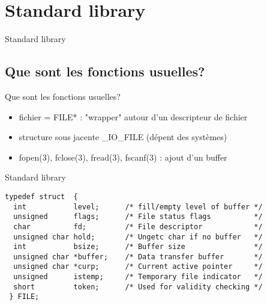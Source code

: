\def\sectitle{Standard library}
\section{\sectitle}

\begin{frame}{\sectitle}
\def\subsectitle{Que sont les fonctions usuelles?}
\subsection{\subsectitle}
\begin{block}{\subsectitle}
\begin{itemize}
    \item fichier = FILE* : "wrapper" autour d'un descripteur de fichier
    \item structure sous jacente \_IO\_FILE (dépent des systèmes)
    \item fopen(3), fclose(3), fread(3), fscanf(3) : ajout d'un buffer
\end{itemize}
\end{block}
\end{frame}




\begin{frame}[containsverbatim]{\sectitle}
\begin{verbatim}
typedef struct  {
  int           level;      /* fill/empty level of buffer */
  unsigned      flags;      /* File status flags          */
  char          fd;         /* File descriptor            */
  unsigned char hold;       /* Ungetc char if no buffer   */
  int           bsize;      /* Buffer size                */
  unsigned char *buffer;    /* Data transfer buffer       */
  unsigned char *curp;      /* Current active pointer     */
  unsigned      istemp;     /* Temporary file indicator   */
  short         token;      /* Used for validity checking */
 } FILE;  

\end{verbatim}
\end{frame}

